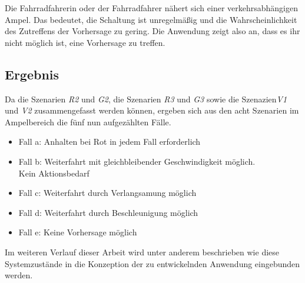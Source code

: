 \centerline{\grayRule}
\begin{description}[leftmargin=0.7cm,style=nextline]
\item[Szenario V2:] 
Die Fahrradfahrerin oder der Fahrradfahrer nähert sich einer verkehrsabhängigen Ampel. Das bedeutet, die Schaltung ist unregelmäßig und die Wahrscheinlichkeit des Zutreffens der Vorhersage zu gering. Die Anwendung zeigt also an, dass es ihr nicht möglich ist, eine Vorhersage zu treffen.\\ 
\end{description} %
\subsection*{Ergebnis}
Da die Szenarien \textit{R2} und \textit{G2}, die Szenarien \textit{R3} und \textit{G3} sowie die Szenazien\textit{V1} und \textit{V2} zusammengefasst werden können, ergeben sich aus den acht Szenarien im Ampelbereich die fünf nun aufgezählten Fälle.
\begin{itemize}
	\item Fall a: Anhalten bei Rot in jedem Fall erforderlich
	\item Fall b: Weiterfahrt mit gleichbleibender Geschwindigkeit möglich.\\ Kein Aktionsbedarf
	\item Fall c: Weiterfahrt durch Verlangsamung möglich
	\item Fall d: Weiterfahrt durch Beschleunigung möglich
	\item Fall e: Keine Vorhersage möglich
\end{itemize}
Im weiteren Verlauf dieser Arbeit wird unter anderem beschrieben wie diese Systemzustände in die Konzeption der zu entwickelnden Anwendung eingebunden werden.
